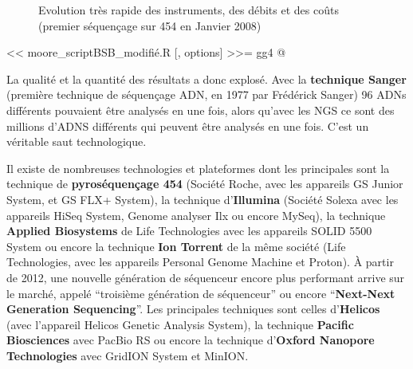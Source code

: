 \documentclass[a4paper,11pt,twoside]{report}
\begin{document}
\begin{figure}[!ht]
\caption{Evolution très rapide des instruments, des débits et des coûts (premier séquençage sur 454 en Janvier 2008)\label{moore}}
\end{figure}

<< moore_scriptBSB_modifié.R [, options] >>=
     gg4
   @

La qualité et la quantité des résultats a donc explosé. Avec la \textbf{technique Sanger} (première technique de séquençage ADN, en 1977 par Frédérick Sanger) 96 ADNs différents pouvaient être analysés en une fois, alors qu'avec les NGS ce sont des millions d'ADNS différents qui peuvent être analysés en une fois. C'est un véritable saut technologique.

Il existe de nombreuses technologies et plateformes dont les principales sont la technique de \textbf{pyroséquençage 454} (Société Roche, avec les appareils GS Junior System, et GS FLX+ System), la technique d'\textbf{Illumina} (Société Solexa avec les appareils HiSeq System, Genome analyser Ilx ou encore MySeq), la technique  \textbf{Applied Biosystems} de Life Technologies avec les appareils SOLID 5500 System ou encore la technique \textbf{Ion Torrent} de la même société (Life Technologies, avec les appareils Personal Genome Machine et Proton). À partir de 2012, une nouvelle génération de séquenceur encore plus performant arrive sur le marché, appelé ``troisième génération de séquenceur'' ou encore ``\textbf{Next-Next Generation Sequencing}''. Les principales techniques sont celles d'\textbf{Helicos} (avec l'appareil Helicos Genetic Analysis System), la technique \textbf{Pacific Biosciences} avec PacBio RS ou encore la technique d'\textbf{Oxford Nanopore Technologies} avec GridION System et MinION. 
\end{document}
